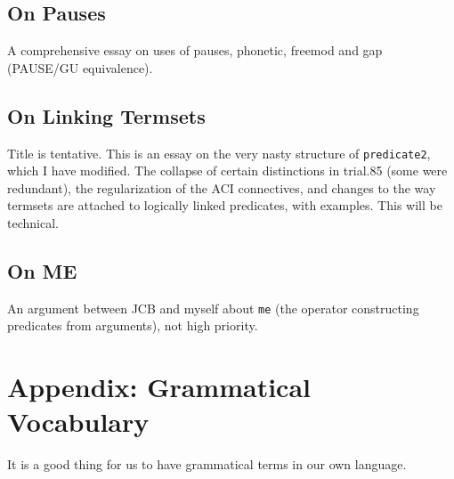 \documentclass[12pt]{article}
\begin{document}
\subsection{On Pauses}

A comprehensive essay on uses of pauses, phonetic, freemod and gap (PAUSE/GU equivalence).

\subsection{On Linking Termsets}

Title is tentative.  This is an essay on the very nasty structure of {\tt predicate2}, which I have modified.
The collapse of certain distinctions in trial.85 (some were redundant), the regularization of the ACI connectives, and changes to the way termsets are attached to logically linked predicates, with examples.   This will be technical.

\subsection{On ME}

An argument between JCB and myself about {\tt me} (the operator constructing predicates from arguments), not high priority.

\section{Appendix:  Grammatical Vocabulary}

It is a good thing for us to have grammatical terms in our own language.
\end{document}
